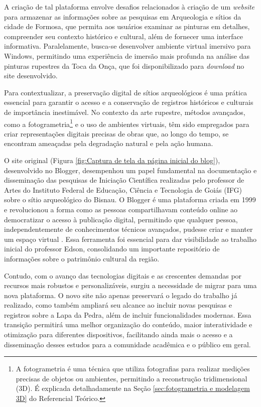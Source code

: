 A criação de tal plataforma envolve desafios relacionados à criação de um \textit{website} para armazenar as informações sobre as pesquisas em Arqueologia e sítios da cidade de Formosa, que permita aos usuários examinar as pinturas em detalhes, compreender seu contexto histórico e cultural, além de fornecer uma interface informativa. Paralelamente, busca-se desenvolver ambiente virtual imersivo para Windows, permitindo uma experiência de imersão mais profunda na análise das pinturas rupestres da Toca da Onça, que foi disponibilizado para \textit{download} no site desenvolvido. 

Para contextualizar, a preservação digital de sítios arqueológicos é uma prática essencial para garantir o acesso e a conservação de registros históricos e culturais de importância inestimável. No contexto da arte rupestre, métodos avançados, como a fotogrametria\footnote{A fotogrametria é uma técnica que utiliza fotografias para realizar medições precisas de objetos ou ambientes, permitindo a reconstrução tridimensional (3D). É explicada detalhadamente na Seção \ref{sec:fotogrametria e modelagem 3D} do Referencial Teórico.} e o uso de ambientes virtuais, têm sido empregados para criar representações digitais precisas de obras que, ao longo do tempo, se encontram ameaçadas pela degradação natural e pela ação humana.

O site original (Figura \ref{fig:Captura de tela da página inicial do blog}), desenvolvido no Blogger, desempenhou um papel fundamental na documentação e disseminação das pesquisas de Iniciação Científica realizadas pelo professor de Artes do Instituto Federal de Educação, Ciência e Tecnologia de Goiás (IFG) sobre o sítio arqueológico do Bisnau. O Blogger é uma plataforma criada em 1999 e revolucionou a forma como as pessoas compartilhavam conteúdo online ao democratizar o acesso à publicação digital, permitindo que qualquer pessoa, independentemente de conhecimentos técnicos avançados, pudesse criar e manter um espaço virtual \citep{BALLARD2012105}. Essa ferramenta foi essencial para dar visibilidade ao trabalho inicial do professor Edson, consolidando um importante repositório de informações sobre o patrimônio cultural da região.

Contudo, com o avanço das tecnologias digitais e as crescentes demandas por recursos mais robustos e personalizáveis, surgiu a necessidade de migrar para uma nova plataforma. O novo site não apenas preservará o legado do trabalho já realizado, como também ampliará seu alcance ao incluir novas pesquisas e registros sobre a Lapa da Pedra, além de incluir funcionalidades modernas. Essa transição permitirá uma melhor organização do conteúdo, maior interatividade e otimização para diferentes dispositivos, facilitando ainda mais o acesso e a disseminação desses estudos para a comunidade acadêmica e o público em geral.

